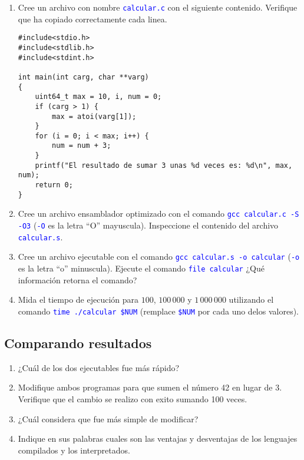 \documentclass[12pt]{article}
\newcommand{\cw}[1]{\texttt{\textcolor{blue}{#1}}}
\begin{document}
\begin{enumerate}[resume]

    \item Cree un archivo con nombre \cw{calcular.c} con el siguiente
        contenido. Verifique que ha copiado correctamente cada linea.

        \begin{verbatim}
#include<stdio.h>
#include<stdlib.h>
#include<stdint.h>

int main(int carg, char **varg)
{
    uint64_t max = 10, i, num = 0;
    if (carg > 1) {
        max = atoi(varg[1]);
    }
    for (i = 0; i < max; i++) {
        num = num + 3;
    }
    printf("El resultado de sumar 3 unas %d veces es: %d\n", max, num);
    return 0;
}
        \end{verbatim}

    \item Cree un archivo ensamblador optimizado con el comando \cw{gcc
        calcular.c -S -O3} (\cw{-O} es la letra ``O'' mayuscula). Inspeccione
        el contenido del archivo \cw{calcular.s}.

    \item Cree un archivo ejecutable con el comando \cw{gcc calcular.s -o
        calcular} (\cw{-o} es la letra ``o'' minuscula). Ejecute el comando
        \cw{file calcular} ¿Qué información retorna el comando?

    \item Mida el tiempo de ejecución para $100$, $100\,000$ y $1\,000\,000$
        utilizando el comando \cw{time ./calcular \$NUM} (remplace \cw{\$NUM}
        por cada uno delos valores).

\end{enumerate}

\subsection{Comparando resultados}

\begin{enumerate}[resume]

    \item ¿Cuál de los dos ejecutables fue más rápido?

    \item Modifique ambos programas para que sumen el número 42 en lugar de 3.
        Verifique que el cambio se realizo con exito sumando 100 veces.

    \item ¿Cuál considera que fue más simple de modificar?

    \item Indique en sus palabras cuales son las ventajas y desventajas de los
        lenguajes compilados y los interpretados.

\end{enumerate}
\end{document}

